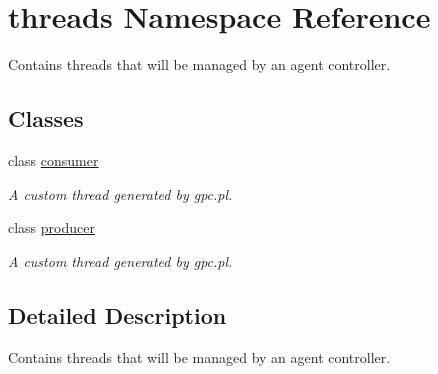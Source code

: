 \hypertarget{namespacethreads}{}\section{threads Namespace Reference}
\label{namespacethreads}


Contains threads that will be managed by an agent controller.  


\subsection*{Classes}
\begin{DoxyCompactItemize}
\item 
class \hyperlink{classthreads_1_1consumer}{consumer}
\begin{DoxyCompactList}\small\item\em A custom thread generated by gpc.\+pl. \end{DoxyCompactList}\item 
class \hyperlink{classthreads_1_1producer}{producer}
\begin{DoxyCompactList}\small\item\em A custom thread generated by gpc.\+pl. \end{DoxyCompactList}\end{DoxyCompactItemize}


\subsection{Detailed Description}
Contains threads that will be managed by an agent controller. 